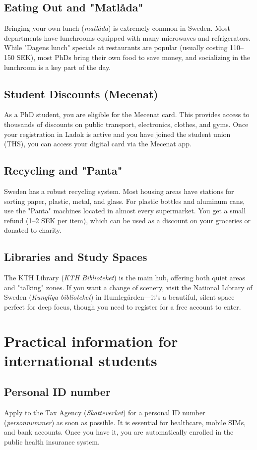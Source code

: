 \documentclass{article}
\begin{document}
\subsection{Eating Out and "Matlåda"}
Bringing your own lunch (\textit{matlåda}) is extremely common in Sweden. Most departments have lunchrooms equipped with many microwaves and refrigerators. While "Dagens lunch" specials at restaurants are popular (usually costing 110–150 SEK), most PhDs bring their own food to save money, and socializing in the lunchroom is a key part of the day.

\subsection{Student Discounts (Mecenat)}
As a PhD student, you are eligible for the Mecenat card. This provides access to thousands of discounts on public transport, electronics, clothes, and gyms. Once your registration in Ladok is active and you have joined the student union (THS), you can access your digital card via the Mecenat app.

\subsection{Recycling and "Panta"}
Sweden has a robust recycling system. Most housing areas have stations for sorting paper, plastic, metal, and glass. For plastic bottles and aluminum cans, use the "Panta" machines located in almost every supermarket. You get a small refund (1–2 SEK per item), which can be used as a discount on your groceries or donated to charity.

\subsection{Libraries and Study Spaces}
The KTH Library (\textit{KTH Biblioteket}) is the main hub, offering both quiet areas and "talking" zones. If you want a change of scenery, visit the National Library of Sweden (\textit{Kungliga biblioteket}) in Humlegården—it's a beautiful, silent space perfect for deep focus, though you need to register for a free account to enter.

\section{Practical information for international students}

\subsection{Personal ID number}
Apply to the Tax Agency (\textit{Skatteverket}) for a personal ID number (\textit{personnummer}) as soon as possible. It is essential for healthcare, mobile SIMs, and bank accounts. Once you have it, you are automatically enrolled in the public health insurance system.
\end{document}
